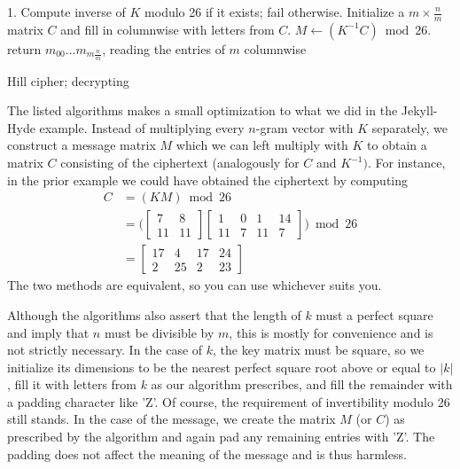 \documentclass{paper}
\begin{document}
\begin{algorithm}
    \SetAlgoLined
    1. Compute inverse of $K$ modulo 26 if it exists; fail otherwise. Initialize a $m \times \frac{n}{m}$ matrix $C$ and fill in columnwise with letters from $C$. $M \gets (K^{-1}C) \bmod 26$. return $m_{00} \dots m_{m\frac{n}{m}}$, reading the entries of $m$ columnwise\;
    \caption{Hill cipher; decrypting}
\end{algorithm}

The listed algorithms makes a small optimization to what we did in the Jekyll-Hyde example. Instead of multiplying every $n$-gram vector with $K$ separately, we construct a message matrix $M$ which we can left multiply with $K$ to obtain a matrix $C$ consisting of the ciphertext (analogously for $C$ and $K^{-1})$. For instance, in the prior example we could have obtained the ciphertext by computing
\begin{equation*}
    \begin{split}
        C & = (KM) \bmod 26 \\ 
        & =  \Big( \begin{bmatrix}7 & 8 \\ 11 & 11\end{bmatrix}\begin{bmatrix}1 & 0 & 1 & 14 \\ 11 & 7 & 11 & 7\end{bmatrix} \Big) \bmod 26 \\
        & = \begin{bmatrix}17 & 4 & 17 & 24 \\ 2 & 25 & 2 & 23\end{bmatrix}
    \end{split}
\end{equation*}
The two methods are equivalent, so you can use whichever suits you. 

\medskip
Although the algorithms also assert that the length of $k$ must a perfect square and imply that $n$ must be divisible by $m$, this is mostly for convenience and is not strictly necessary. In the case of $k$, the key matrix must be square, so we initialize its dimensions to be the nearest perfect square root above or equal to $|k|$, fill it with letters from $k$ as our algorithm prescribes, and fill the remainder with a padding character like 'Z'. Of course, the requirement of invertibility modulo 26 still stands. In the case of the message, we create the matrix $M$ (or $C$) as prescribed by the algorithm and again pad any remaining entries with 'Z'. The padding does not affect the meaning of the message and is thus harmless.
\end{document}
